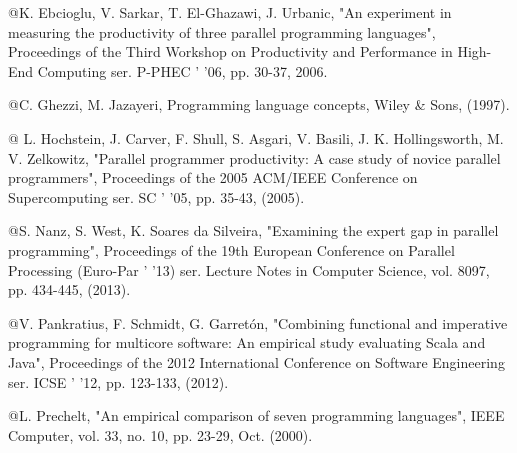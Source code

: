 \documentclass{sig-alternate}
\begin{document}
\begin{thebibliography}{9}
		
		\bibitem @K. Ebcioglu, V. Sarkar, T. El-Ghazawi, J. Urbanic, "An experiment in measuring the productivity of three parallel programming languages", Proceedings of the Third Workshop on Productivity and Performance in High-End Computing ser. P-PHEC ' '06, pp. 30-37, 2006.
		
		\bibitem @C. Ghezzi, M. Jazayeri, Programming language concepts, Wiley & Sons, (1997).
		
		\bibitem @ 
		L. Hochstein, J. Carver, F. Shull, S. Asgari, V. Basili, J. K. Hollingsworth, M. V. Zelkowitz, "Parallel programmer productivity: A case study of novice parallel programmers", Proceedings of the 2005 ACM/IEEE Conference on Supercomputing ser. SC ' '05, pp. 35-43, (2005).
		
		
		\bibitem @S. Nanz, S. West, K. Soares da Silveira, "Examining the expert gap in parallel programming", Proceedings of the 19th European Conference on Parallel Processing (Euro-Par ' '13) ser. Lecture Notes in Computer Science, vol. 8097, pp. 434-445, (2013).
		
		
		\bibitem @V. Pankratius, F. Schmidt, G. Garretón, "Combining functional and imperative programming for multicore software: An empirical study evaluating Scala and Java", Proceedings of the 2012 International Conference on Software Engineering ser. ICSE ' '12, pp. 123-133, (2012).
		
		
		\bibitem @L. Prechelt, "An empirical comparison of seven programming languages", IEEE Computer, vol. 33, no. 10, pp. 23-29, Oct. (2000).
		
		
		
	\end{thebibliography}
\end{document}
